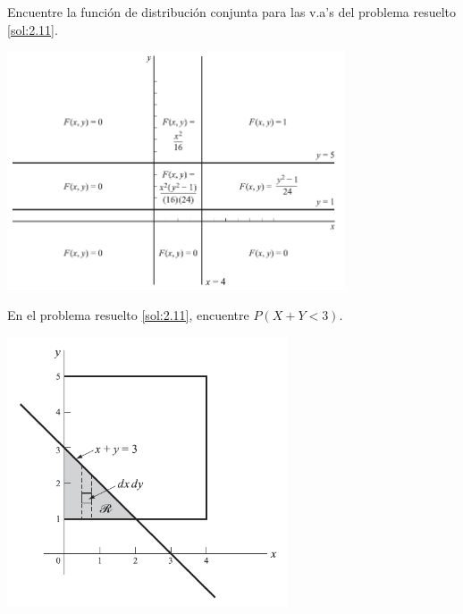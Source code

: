  \begin{ejemplo}
  \label{sol:2.13}
  Encuentre la función de distribución conjunta para las v.a's del problema resuelto \ref{sol:2.11}.
 \end{ejemplo}



 \begin{center}
 \includegraphics[width=10cm,keepaspectratio=true]{./pe/pands0209.png}
\end{center}




 \begin{ejemplo}
  \label{sol:2.14}
  En el problema resuelto \ref{sol:2.11}, encuentre $P(X+Y<3)$.
 \end{ejemplo}



 \begin{center}
 \includegraphics[height=8cm,keepaspectratio=true]{./pe/pands0210.png}
\end{center}



